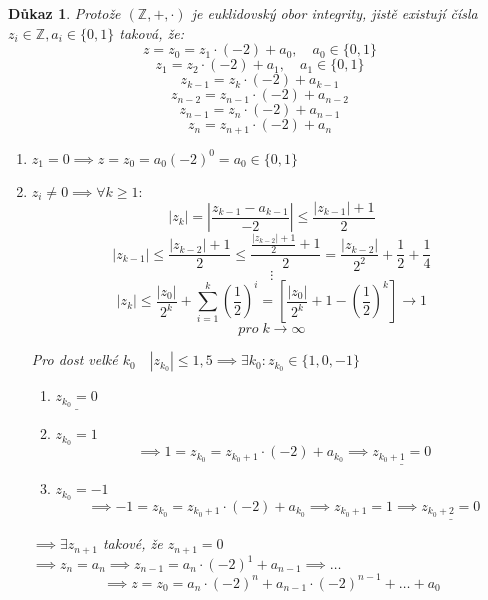 \documentclass[12pt]{book}
\newtheorem*{dukaz}{Důkaz}
\begin{document}
\begin{dukaz}\label{negaDF}
	Protože $(\mathbb{Z},+,\cdot)$ je euklidovský obor integrity, jistě existují čísla $z_i\in\mathbb{Z}, a_i\in\{0,1\}$ taková, že:
	$$ z=z_0=z_1\cdot(-2)+a_0,\quad a_0\in\{0,1\}$$
	$$ z_1=z_2\cdot(-2)+a_1,\quad a_1\in\{0,1\}$$
	$$ z_{k-1}=z_k\cdot(-2)+a_{k-1}$$
	$$ z_{n-2}=z_{n-1}\cdot(-2)+a_{n-2}$$
	$$ z_{n-1}=z_n\cdot(-2)+a_{n-1}$$
	$$ z_n=z_{n+1}\cdot(-2)+a_n$$
	\begin{enumerate}
		\item[$\alpha)$] $z_1=0 \implies z=z_0=a_0(-2)^0=a_0\in\{0,1\}$
		\item[$\beta)$]  $z_i \ne 0 \implies \forall k \ge 1:$
		$$|z_k|=\left|\frac{z_{k-1}-a_{k-1}}{-2}\right|\le \frac{|z_{k-1}|+1}{2}$$
		$$|z_{k-1}|\le\frac{|z_{k-2}|+1}{2}\le\frac{\frac{|z_{k-2}|+1}{2}+1}{2}=\frac{|z_{k-2}|}{2^2}+\frac{1}{2}+\frac{1}{4}$$
		$$\vdots$$
		$$|z_k|\le\frac{|z_0|}{2^k}+\sum_{i=1}^{k}\left(\frac{1}{2}\right)^i=\left[\frac{|z_0|}{2^k}+1-\left(\frac{1}{2}\right)^k \right]\to 1 $$
		$$ pro\; k \to \infty $$
		
		Pro dost velké $k_0 \quad |z_{k_0}|\le1,5 \implies \exists k_0:z_{k_0}\in\{1,0,-1\}$
		\begin{enumerate}
			\item[a)] $\underline{z_{k_0}=0}$
			\item[b)]$z_{k_0}=1$
			$$\implies 1=z_{k_0}=z_{k_0+1}\cdot(-2)+a_{k_0}\implies \underline{z_{k_0+1}=0}$$
			\item[c)]$z_{k_0}=-1$
			$$\implies -1=z_{k_0}=z_{k_0+1}\cdot(-2)+a_{k_0}\implies z_{k_0+1}=1\implies \underline{z_{k_0+2}=0}$$ 
			\end{enumerate}
		$\implies \exists z_{n+1}$ takové, že $z_{n+1}=0$\newline
		$\implies z_n = a_n \implies z_{n-1}=a_n\cdot(-2)^1+a_{n-1}\implies \dots$
		$$\implies z=z_0=a_n\cdot(-2)^n+a_{n-1}\cdot(-2)^{n-1}+\dots+a_0$$
	\end{enumerate}
\end{dukaz}
\end{document}
